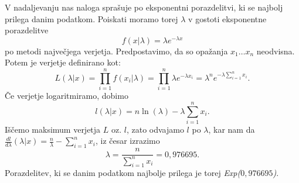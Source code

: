 \documentclass{article}
\begin{document}
V nadaljevanju nas naloga sprašuje po eksponentni porazdelitvi, ki se najbolj prilega danim podatkom.
Poiskati moramo torej $\lambda$ v gostoti eksponentne porazdelitve 
$$ f (x | \lambda) = \lambda e^{- \lambda x} $$
po metodi največjega verjetja. Predpostavimo, da so opažanja $x_1 \dots x_n$ neodvisna.
Potem je verjetje definirano kot:
$$ L (\lambda | x) = \prod_{i=1}^{n} f (x_i | \lambda) = \prod_{i=1}^{n} \lambda e^{- \lambda x_i} = \lambda^n e^{- \lambda \sum_{i=1}^{n}x_i} \text{.}$$
Če verjetje logaritmiramo, dobimo 
$$ l (\lambda | x) = n \ln (\lambda) - \lambda \sum_{i=1}^{n}x_i \text{.} $$
Iščemo maksimum verjetja $L$ oz. $l$, zato odvajamo $l$ po $\lambda$, kar nam da 
$\frac{dl}{d\lambda} ( \lambda | x) = \frac{n}{\lambda} - \sum_{i=1}^{n}x_i$, iz česar
izrazimo 
$$ \lambda = \frac{n}{\sum_{i=1}^{n}x_i} = 0{,}976695 \text{.}$$
Porazdelitev, ki se danim podatkom najbolje prilega je torej \emph{Exp($0{,}976695$)}.
\end{document}
